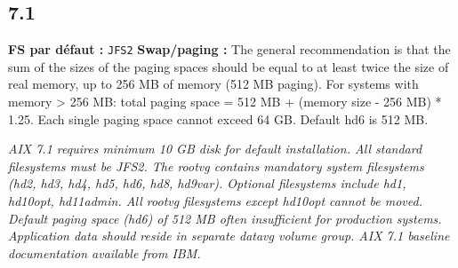 \documentclass[10pt,a4paper]{article}
\begin{document}
\subsection{7.1}
\noindent\small \textbf{FS par d\'efaut :} \texttt{JFS2} \quad\textbullet\quad \textbf{Swap/paging :} The general recommendation is that the sum of the sizes of the paging spaces should be equal to at least twice the size of real memory, up to 256 MB of memory (512 MB paging). For systems with memory > 256 MB: total paging space = 512 MB + (memory size - 256 MB) * 1.25. Each single paging space cannot exceed 64 GB. Default hd6 is 512 MB.\normalsize\par\smallskip
\noindent\small\textit{AIX 7.1 requires minimum 10 GB disk for default installation. All standard filesystems must be JFS2. The rootvg contains mandatory system filesystems (hd2, hd3, hd4, hd5, hd6, hd8, hd9var). Optional filesystems include hd1, hd10opt, hd11admin. All rootvg filesystems except hd10opt cannot be moved. Default paging space (hd6) of 512 MB often insufficient for production systems. Application data should reside in separate datavg volume group. AIX 7.1 baseline documentation available from IBM.}\normalsize\par\smallskip
\end{document}

